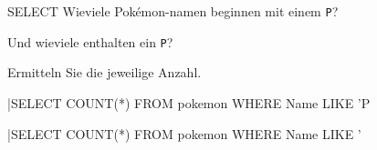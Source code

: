 \begin{example}{SELECT}
    Wieviele Pokémon-namen beginnen mit einem \texttt{P}?
    
    Und wieviele enthalten ein \texttt{P}?
    
    Ermitteln Sie die jeweilige Anzahl.

    \exampleseparator

    |SELECT COUNT(*) FROM pokemon WHERE Name LIKE 'P%

    

    |SELECT COUNT(*) FROM pokemon WHERE Name LIKE '%

    
\end{example}